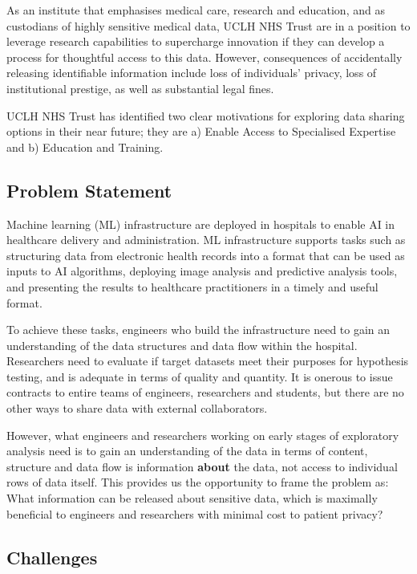 \documentclass[11pt]{article}
\begin{document}
As an institute that emphasises medical care, research and education, and as custodians of highly sensitive medical data, UCLH NHS Trust are in a position to leverage research capabilities to supercharge innovation if they can develop a process for thoughtful access to this data. However, consequences of accidentally releasing identifiable information include loss of individuals' privacy, loss of institutional prestige, as well as substantial legal fines.

UCLH NHS Trust has identified two clear motivations for exploring data sharing options in their near future; they are a) Enable Access to Specialised Expertise and b) Education and Training. 

\subsection{Problem Statement}

Machine learning (ML) infrastructure are deployed in hospitals to enable AI in healthcare delivery and administration. ML infrastructure supports tasks such as structuring data from electronic health records into a format that can be used as inputs to AI algorithms, deploying image analysis and predictive analysis tools, and presenting the results to healthcare practitioners in a timely and useful format.

To achieve these tasks, engineers who build the infrastructure need to gain an understanding of the data structures and data flow within the hospital. Researchers need to evaluate if target datasets meet their purposes for hypothesis testing, and is adequate in terms of quality and quantity. It is onerous to issue contracts to entire teams of engineers, researchers and students, but there are no other ways to share data with external collaborators. 

However, what engineers and researchers working on early stages of exploratory analysis need is to gain an understanding of the data in terms of content, structure and data flow is information \textbf{about} the data, not access to individual rows of data itself. This provides us the opportunity to frame the problem as: What information can be released about sensitive data, which is maximally beneficial to engineers and researchers with minimal cost to patient privacy?

\subsection{Challenges}
\end{document}
